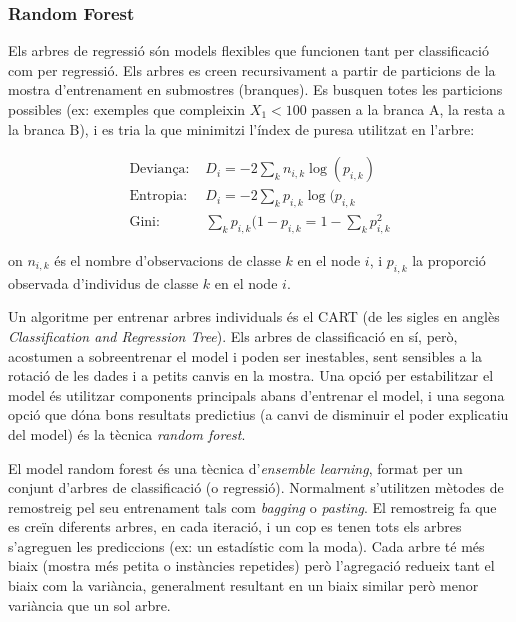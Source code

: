 \documentclass[12pt, spanish]{article}
\begin{document}
\subsubsection{Random Forest}

Els arbres de regressió són models flexibles que funcionen tant per classificació com per regressió. Els arbres es creen recursivament a partir de particions de la mostra d'entrenament en submostres (branques). Es busquen totes les particions possibles (ex: exemples que compleixin $X_1 < 100$ passen a la branca A, la resta a la branca B), i es tria la que minimitzi l'índex de puresa utilitzat en l'arbre:

\begin{equation} 
\begin{split}
\text{Deviança: } & D_i = -2 \sum_k n_{i,k} \log(p_{i,k}) \\
\text{Entropia: }&  D_i = -2 \sum_k p_{i,k}\log(p_{i,k}\\
\text{Gini: }& \sum_k p_{i,k}(1 - p_{i,k} = 1 - \sum_k p_{i,k}^2
\end{split}
\end{equation}

on $n_{i,k}$ és el nombre d'observacions de classe $k$ en el node $i$, i $p_{i,k}$ la proporció observada d'individus de classe $k$ en el node $i$. 

Un algoritme per entrenar arbres individuals és el CART (de les sigles en anglès \textit{Classification and Regression Tree}). Els arbres de classificació en sí, però, acostumen a sobreentrenar el model i poden ser inestables, sent sensibles a la rotació de les dades i a petits canvis en la mostra. Una opció per estabilitzar el model és utilitzar components principals abans d'entrenar el model, i una segona opció que dóna bons resultats predictius (a canvi de disminuir el poder explicatiu del model) és la tècnica \textit{random forest}.

El model random forest és una tècnica d'\textit{ensemble learning}, format per un conjunt d'arbres de classificació (o regressió). Normalment s'utilitzen mètodes de remostreig pel seu entrenament tals com \textit{bagging} o \textit{pasting}. El remostreig fa que es creïn diferents arbres, en cada iteració, i un cop es tenen tots els arbres s'agreguen les prediccions (ex: un estadístic com la moda). Cada arbre té més biaix (mostra més petita o instàncies repetides) però  l'agregació redueix tant el biaix com la variància, generalment resultant en un biaix similar però menor variància que un sol arbre.
\end{document}
